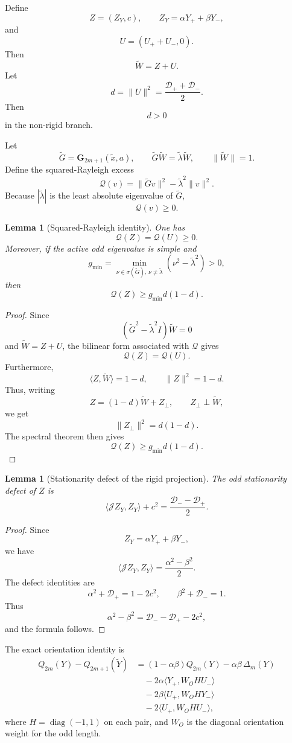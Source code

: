 \documentclass[11pt]{article}
\numberwithin{equation}{section}
\newtheorem{lemma}[theorem]{Lemma}
\begin{document}
Define
\[
Z=(Z_Y,c),
\qquad
Z_Y=\alpha Y_++\beta Y_-,
\]
and
\[
U=(U_++U_-,0).
\]
Then
\[
\widetilde W=Z+U.
\]
Let
\[
d=\|U\|^2
=
\frac{\mathcal D_++\mathcal D_-}{2}.
\]
Then
\[
d>0
\]
in the non-rigid branch.

Let
\[
\widetilde G=
\mathbf G_{2m+1}(\widetilde x,a),
\qquad
\widetilde G\widetilde W=\widetilde\lambda\widetilde W,
\qquad
\|\widetilde W\|=1.
\]
Define the squared-Rayleigh excess
\[
\mathcal Q(v)
=
\|\widetilde Gv\|^2-\widetilde\lambda^2\|v\|^2.
\]
Because \(|\widetilde\lambda|\) is the least absolute eigenvalue of \(\widetilde G\),
\[
\mathcal Q(v)\ge0.
\]

\begin{lemma}[Squared-Rayleigh identity]
\label{lem:QZQU}
One has
\[
\mathcal Q(Z)=\mathcal Q(U)\ge0.
\]
Moreover, if the active odd eigenvalue is simple and
\[
g_{\min}
=
\min_{\nu\in\sigma(\widetilde G),\,\nu\ne\widetilde\lambda}
(\nu^2-\widetilde\lambda^2)>0,
\]
then
\[
\mathcal Q(Z)\ge g_{\min}d(1-d).
\]
\end{lemma}

\begin{proof}
Since
\[
(\widetilde G^2-\widetilde\lambda^2I)\widetilde W=0
\]
and \(\widetilde W=Z+U\), the bilinear form associated with \(\mathcal Q\) gives
\[
\mathcal Q(Z)=\mathcal Q(U).
\]
Furthermore,
\[
\langle Z,\widetilde W\rangle=1-d,
\qquad
\|Z\|^2=1-d.
\]
Thus, writing
\[
Z=(1-d)\widetilde W+Z_\perp,\qquad Z_\perp\perp\widetilde W,
\]
we get
\[
\|Z_\perp\|^2=d(1-d).
\]
The spectral theorem then gives
\[
\mathcal Q(Z)\ge g_{\min}d(1-d).
\]
\end{proof}

\begin{lemma}[Stationarity defect of the rigid projection]
\label{lem:stationarity-defect}
The odd stationarity defect of \(Z\) is
\[
\langle \mathcal JZ_Y,Z_Y\rangle+c^2
=
\frac{\mathcal D_--\mathcal D_+}{2}.
\]
\end{lemma}

\begin{proof}
Since
\[
Z_Y=\alpha Y_++\beta Y_-,
\]
we have
\[
\langle \mathcal JZ_Y,Z_Y\rangle
=
\frac{\alpha^2-\beta^2}{2}.
\]
The defect identities are
\[
\alpha^2+\mathcal D_+=1-2c^2,
\qquad
\beta^2+\mathcal D_-=1.
\]
Thus
\[
\alpha^2-\beta^2=\mathcal D_--\mathcal D_+-2c^2,
\]
and the formula follows.
\end{proof}

The exact orientation identity is
\[
\begin{aligned}
Q_{2m}(Y)-Q_{2m+1}(\widetilde Y)
&=
(1-\alpha\beta)Q_{2m}(Y)
-\alpha\beta\,\Delta_m(Y)
\\
&\quad
-2\alpha\langle Y_+,W_OHU_-\rangle
\\
&\quad
-2\beta\langle U_+,W_OHY_-\rangle
\\
&\quad
-2\langle U_+,W_OHU_-\rangle,
\end{aligned}
\]
where \(H=\operatorname{diag}(-1,1)\) on each pair, and \(W_O\) is the diagonal orientation
weight for the odd length.
\end{document}
